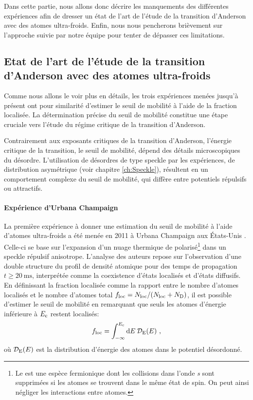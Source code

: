 Dans cette partie, nous allons donc décrire les manquements des différentes expériences afin de dresser un état de l'art de l'étude de la transition d'Anderson avec des atomes ultra-froids. Enfin, nous nous pencherons brièvement sur l'approche suivie par notre équipe pour tenter de dépasser ces limitations.

\subsection{Etat de l'art de l'étude de la transition d'Anderson avec des atomes ultra-froids}
\label{sc:etat_art_transition}
Comme nous allons le voir plus en détails, les trois expériences menées jusqu'à présent ont pour similarité d'estimer le seuil de mobilité à l'aide de la fraction localisée. La détermination précise du seuil de mobilité constitue une étape cruciale vers l'étude du régime critique de la transition d'Anderson. 

Contrairement aux exposants critiques de la transition d'Anderson, l'énergie critique de la transition, le seuil de mobilité, dépend des détails microscopiques du désordre. L'utilisation de désordres de type speckle par les expériences, de distribution asymétrique (voir chapitre \ref{ch:Speckle}), résultent en un comportement complexe du seuil de mobilité, qui diffère entre potentiels répulsifs ou attractifs. 


\paragraph*{Expérience d'Urbana Champaign}
La première expérience à donner une estimation du seuil de mobilité à l'aide d'atomes ultra-froids a été menée en 2011 à Urbana Champaign aux États-Unis \citep{kondov2011three}. Celle-ci se base sur l'expansion d'un nuage thermique de  polarisé\footnote{Le  est une espèce fermionique dont les collisions dans l'onde \textit{s} sont supprimées si les atomes se trouvent dans le même état de spin. On peut ainsi négliger les interactions entre atomes.} dans un speckle répulsif anisotrope. L'analyse des auteurs repose sur l'observation d'une double structure du profil de densité atomique pour des temps de propagation $t\geq \SI{20}{\milli\second}$, interprétée comme la coexistence d'états localisés et d'états diffusifs. En définissant la fraction localisée comme la rapport entre le nombre d'atomes localisés et le nombre d'atomes total $f_{\mathrm{loc}}=N_{\mathrm{loc}}/(N_{\mathrm{loc}}+N_{\mathrm{D}})$, il est possible d'estimer le seuil de mobilité en remarquant que seuls les atomes d'énergie inférieure à $E_{\mathrm{c}}$ restent localisés:
\begin{equation}
f_{\mathrm{loc}}=\int_{-\infty}^{E_{\mathrm{c}}}{\mathrm{d}E \: \mathcal{D}_{\mathrm{E}}(E)} \text{ ,}
\label{eq:fraction_localisee}
\end{equation}
où $\mathcal{D}_{\mathrm{E}}(E)$ est la distribution d'énergie des atomes dans le potentiel désordonné.


